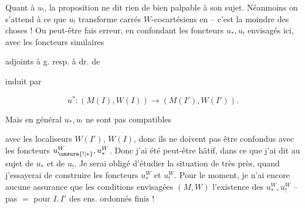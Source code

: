 Quant à $u_!$, la proposition ne dit rien de bien palpable à son sujet. Néanmoins on s'attend à ce que $u_!$ transforme carrés $W$-cocartésiens en  -- c'est la moindre des choses ! Ou peut-être  fais erreur, en confondant les foncteurs $u_*,u_!$ envisagés ici, avec les foncteurs similaires 


adjoints à g. resp. à dr. de


induit par

\[ u^*:(M(I),W(I))\longrightarrow(M(I'),W(I')). \]

Mais en général $u_*,u_!$ ne sont pas compatibles

avec les localiseurs $W(I')$, $W(I)$, donc ils ne  doivent pas être confondus avec les foncteurs $u_{\unsure{!|*}}^W,u_*^W$.  Donc j'ai été peut-être hâtif, dans ce que j'ai dit au sujet de $u_*$ et de $u_!$. Je serai obligé d'étudier la situation de très près, quand j'essayerai de construire les foncteurs $u_*^W$ et $u_!^W$. Pour le moment, je n'ai encore aucune assurance que les conditions envisagées  $(M,W)$   l'existence des $u_*^W,u_!^W$ -- pas $=$ pour $I,I'$ des ens. ordonnés finis !






